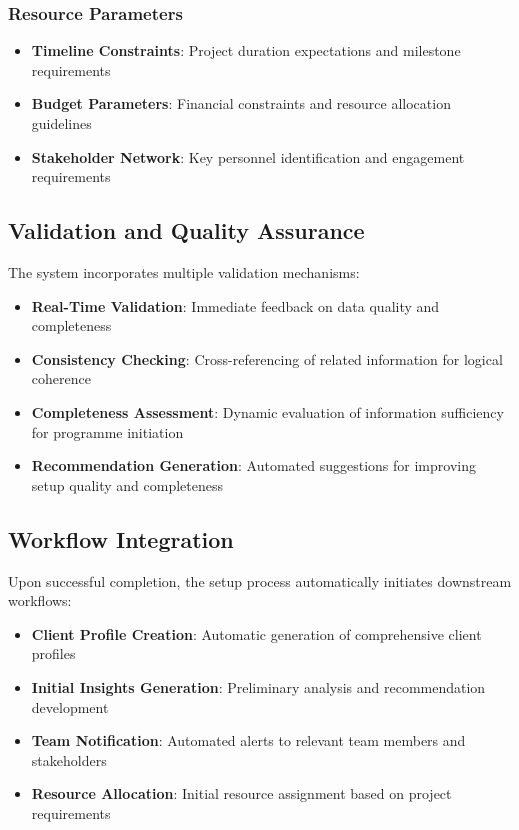 \documentclass{article}
\begin{document}
\subsubsection{Resource Parameters}
\begin{itemize}
    \item \textbf{Timeline Constraints}: Project duration expectations and milestone requirements
    \item \textbf{Budget Parameters}: Financial constraints and resource allocation guidelines
    \item \textbf{Stakeholder Network}: Key personnel identification and engagement requirements
\end{itemize}

\subsection{Validation and Quality Assurance}
The system incorporates multiple validation mechanisms:

\begin{itemize}
    \item \textbf{Real-Time Validation}: Immediate feedback on data quality and completeness
    \item \textbf{Consistency Checking}: Cross-referencing of related information for logical coherence
    \item \textbf{Completeness Assessment}: Dynamic evaluation of information sufficiency for programme initiation
    \item \textbf{Recommendation Generation}: Automated suggestions for improving setup quality and completeness
\end{itemize}

\subsection{Workflow Integration}
Upon successful completion, the setup process automatically initiates downstream workflows:

\begin{itemize}
    \item \textbf{Client Profile Creation}: Automatic generation of comprehensive client profiles
    \item \textbf{Initial Insights Generation}: Preliminary analysis and recommendation development
    \item \textbf{Team Notification}: Automated alerts to relevant team members and stakeholders
    \item \textbf{Resource Allocation}: Initial resource assignment based on project requirements
\end{itemize}
\end{document}

